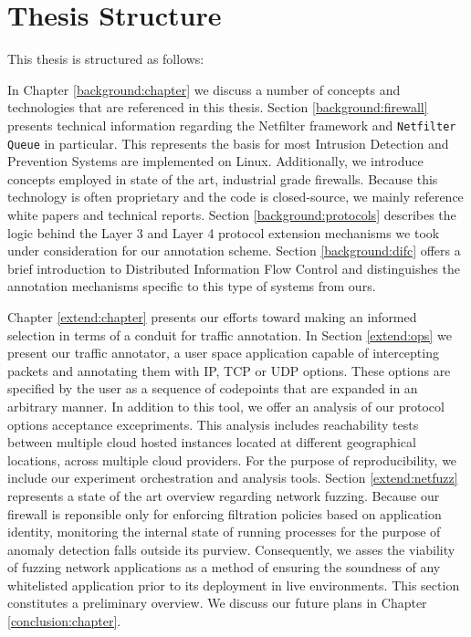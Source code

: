 \section{Thesis Structure}
\label{intro:structure}

This thesis is structured as follows:

In Chapter \ref{background:chapter} we discuss a number of concepts and
technologies that are referenced in this thesis. Section \ref{background:firewall}
presents technical information regarding the Netfilter framework and
\texttt{Netfilter Queue} in particular. This represents the basis for most
Intrusion Detection and Prevention Systems are implemented on Linux. Additionally,
we introduce concepts employed in state of the art, industrial grade firewalls.
Because this technology is often proprietary and the code is closed-source, we
mainly reference white papers and technical reports. Section \ref{background:protocols}
describes the logic behind the Layer 3 and Layer 4 protocol extension mechanisms
we took under consideration for our annotation scheme. Section \ref{background:difc}
offers a brief introduction to Distributed Information Flow Control and
distinguishes the annotation mechanisms specific to this type of systems from
ours.

Chapter \ref{extend:chapter} presents our efforts toward making an informed
selection in terms of a conduit for traffic annotation. In Section \ref{extend:ops}
we present our traffic annotator, a user space application capable of intercepting
packets and annotating them with IP, TCP or UDP options. These options are
specified by the user as a sequence of codepoints that are expanded in an
arbitrary manner. In addition to this tool, we offer an analysis of our protocol
options acceptance excepriments. This analysis includes reachability tests between
multiple cloud hosted instances located at different geographical locations,
across multiple cloud providers. For the purpose of reproducibility, we include
our experiment orchestration and analysis tools. Section \ref{extend:netfuzz}
represents a state of the art overview regarding network fuzzing. Because our
firewall is reponsible only for enforcing filtration policies based on application
identity, monitoring the internal state of running processes for the purpose of
anomaly detection falls outside its purview. Consequently, we asses the viability
of fuzzing network applications as a method of ensuring the soundness of any
whitelisted application prior to its deployment in live environments. This
section constitutes a preliminary overview. We discuss our future plans in
Chapter \ref{conclusion:chapter}.

